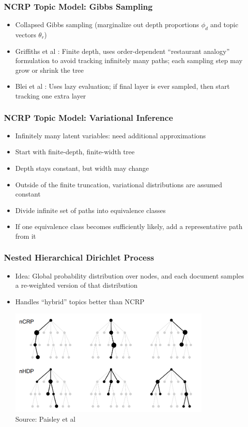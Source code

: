 \begin{frame}
\frametitle{NCRP Topic Model: Gibbs Sampling}
\begin{itemize}[<+->]
\item Collapsed Gibbs sampling (marginalize out depth proportions $\phi_d$ and topic vectors $\theta_r$)
\item Griffiths et al \cite{griffiths2004hierarchical}: Finite depth, uses order-dependent ``restaurant analogy'' formulation to avoid tracking infinitely many paths; each sampling step may grow or shrink the tree
\item Blei et al \cite{blei2010ncrp}: Uses lazy evaluation; if final layer is ever sampled, then start tracking one extra layer
\end{itemize}
\end{frame}

\begin{frame}
\frametitle{NCRP Topic Model: Variational Inference}
\begin{itemize}[<+->]
\item Infinitely many latent variables: need additional approximations
\item Start with finite-depth, finite-width tree
\item Depth stays constant, but width may change
\item Outside of the finite truncation, variational distributions are assumed constant
\item Divide infinite set of paths into equivalence classes
\item If one equivalence class becomes sufficiently likely, add a representative path from it
\end{itemize}
\end{frame}

\begin{frame}
\frametitle{Nested Hierarchical Dirichlet Process}
\begin{itemize}[<+->]
\item Idea: Global probability distribution over nodes, and each document samples a re-weighted version of that distribution
\item Handles ``hybrid'' topics better than NCRP
\begin{center}
\includegraphics[width=0.8\textwidth]{../figures/ncrp_vs_nhdp.png} \\
{\tiny Source: Paisley et al \cite{paisley2015nhdp}}
\end{center}
\end{itemize}
\end{frame}

